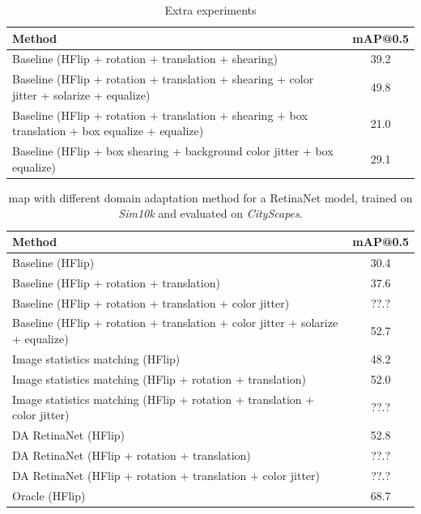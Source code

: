 \documentclass[%
    corpo=12pt,
    twoside,
    stile=classica,   
    tipotesi=magistrale,
    evenboxes,
    english
]{toptesi}
\begin{document}

\begin{table}[ht!]
	\centering
	\begin{tabularx}{\linewidth}{|X|c|}
		\hline
		Method  &   mAP@0.5 \\
		\hline\hline
		Baseline (HFlip + rotation + translation + shearing)      &   39.2   \\
		\hline
		Baseline (HFlip + rotation + translation + shearing + color jitter + solarize + equalize)      &   49.8   \\
		\hline
		Baseline (HFlip + rotation + translation + shearing + box translation + box equalize + equalize)      &   21.0   \\
		\hline
		Baseline (HFlip + box shearing + background color jitter + box equalize)      &   29.1   \\
		\hline
	\end{tabularx}
	\caption{Extra experiments}
	\label{table:extra}
\end{table}

\begin{table}[ht!]
	\centering
	\begin{tabularx}{\linewidth}{|X|c|}
		\hline
		Method  &   mAP@0.5 \\
		\hline\hline
		Baseline (HFlip)       &   30.4   \\
		\hline
		Baseline (HFlip + rotation + translation)      &   37.6   \\
		\hline
		Baseline (HFlip + rotation + translation + color jitter)      &   ??.?   \\
		\hline
		Baseline (HFlip + rotation + translation + color jitter + solarize + equalize)      &   52.7   \\
		\hline
		Image statistics matching (HFlip)  &   48.2    \\
		\hline
		Image statistics matching (HFlip + rotation + translation)  &   52.0    \\
		\hline
		Image statistics matching (HFlip + rotation + translation + color jitter)  &   ??.?    \\
		\hline
		DA RetinaNet (HFlip)   &   52.8    \\
		\hline
		DA RetinaNet (HFlip + rotation + translation)   &   ??.?    \\
		\hline
		DA RetinaNet (HFlip + rotation + translation + color jitter)   &   ??.?    \\
		\hline\hline
		Oracle (HFlip) &   68.7    \\
		\hline
	\end{tabularx}
	\caption{\gls{map} with different domain adaptation method for a RetinaNet model, trained on \textit{Sim10k} and evaluated on \textit{CityScapes}.}
	\label{table:retinanet}
\end{table}
\end{document}

